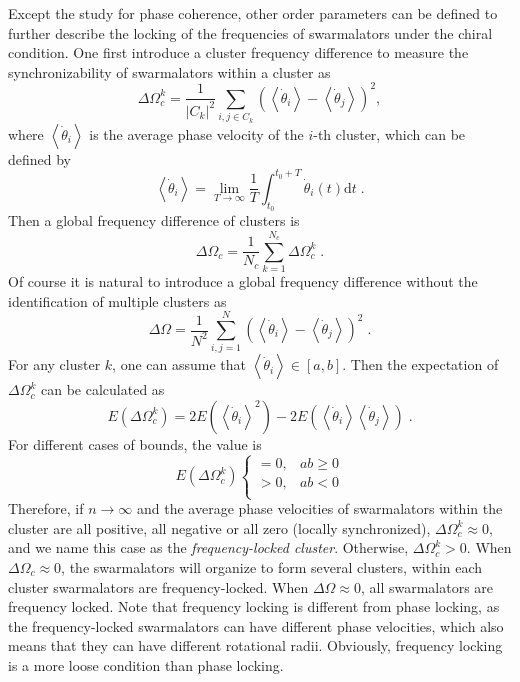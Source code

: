 \documentclass{article}
\begin{document}
Except the study for phase coherence, other order parameters can be defined to further describe the locking of the frequencies of swarmalators under the chiral condition. One first introduce a cluster frequency difference to measure the synchronizability of swarmalators within a cluster as
\begin{equation}
    \Delta \Omega_c^k = \frac{1}{\left| C_k \right|^2}\sum_{i,j\in C_k}{\left( \left< \dot{\theta}_i \right> -\left< \dot{\theta}_j \right> \right) ^2} ,
    \label{eq:clusterfrequency}
\end{equation}
where $\left< \dot{\theta}_i \right>$ is the average phase velocity of the $i$-th cluster, which can be defined by
\begin{equation}
    \left< \dot{\theta}_i \right> =\lim_{T\rightarrow \infty} \frac{1}{T}\int_{t_0}^{t_0+T}{\dot{\theta}_i\left( t \right) \mathrm{d}t}\;.
    \label{eq:frequency}
\end{equation}
Then a global frequency difference of clusters is
\begin{equation}
    \Delta \Omega_c =\frac{1}{N_c}\sum_{k=1}^{N_c} {\Delta \Omega_c^k}\;.
    \label{eq:globalcluster}
\end{equation}
Of course it is natural to introduce a global frequency difference without the identification of multiple clusters as
\begin{equation}
    \Delta \Omega =\frac{1}{N^2}\sum_{i,j=1}^{N}{\left( \left< \dot{\theta}_i \right> -\left< \dot{\theta}_j \right> \right) ^2 }\;.
    \label{eq:frequencydifference}
\end{equation}
For any cluster $k$, one can assume that $\left< \dot{\theta}_i \right>\in \left[a, b\right]$. Then the expectation of $\Delta \Omega_c^k$ can be calculated as
\begin{equation}
    E\left( \Delta \Omega _{c}^{k} \right) =2E\left( \left< \dot{\theta}_i \right> ^2 \right) -2E\left( \left< \dot{\theta}_i \right> \left< \dot{\theta}_j \right> \right)\;.
\end{equation}
For different cases of bounds, the value is
\begin{equation}
    E\left( \Delta \Omega _{c}^{k} \right) \begin{cases}
        =0,&		ab\ge 0\\
        >0,&		ab<0\\
    \end{cases}
\end{equation}
Therefore, if $n\rightarrow\infty$ and the average phase velocities of swarmalators within the cluster are all positive, all negative or all zero (locally synchronized), $\Delta \Omega _{c}^{k}\approx0$, and we name this case as the \textit{frequency-locked cluster}. Otherwise, $\Delta \Omega _{c}^{k}>0$. 
When $\Delta\Omega_c \approx 0$, the swarmalators will organize to form several clusters, within each cluster swarmalators are frequency-locked. When $\Delta\Omega \approx 0$, all swarmalators are frequency locked. Note that frequency locking is different from phase locking, as the frequency-locked swarmalators can have different phase velocities, which also means that they can have different rotational radii. 
Obviously, frequency locking is a more loose condition than phase locking. 
\end{document}
